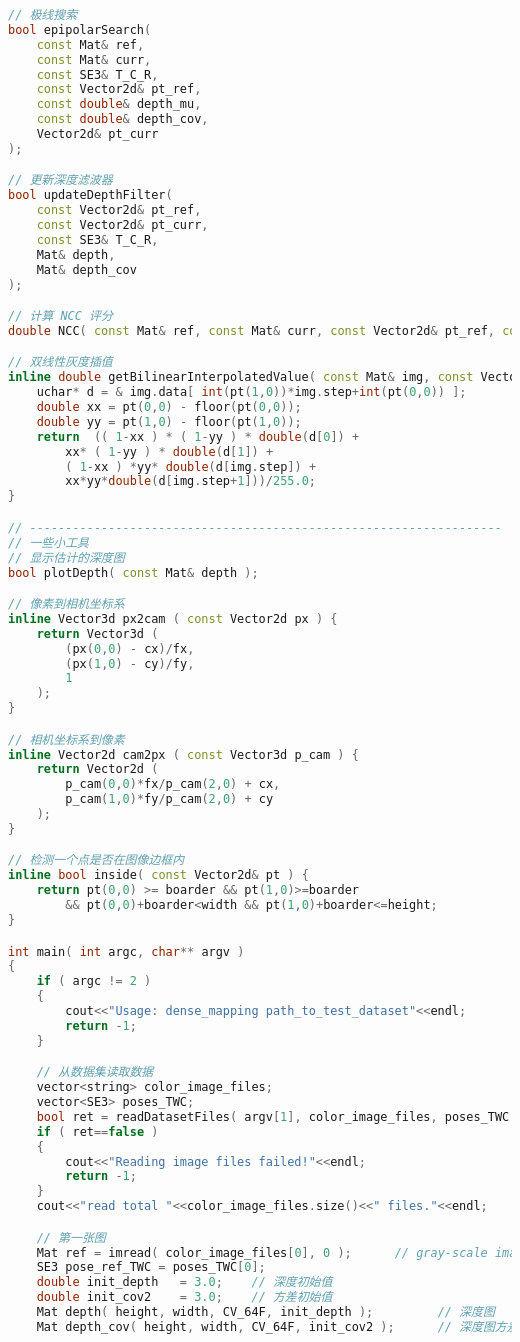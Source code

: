 \begin{lstlisting}[language=c++,caption=slambook/ch13/dense\_monocular/dense\_mapping.cpp（片段）]
// 极线搜索 
bool epipolarSearch( 
	const Mat& ref, 
	const Mat& curr, 
	const SE3& T_C_R, 
	const Vector2d& pt_ref, 
	const double& depth_mu, 
	const double& depth_cov,
	Vector2d& pt_curr
);

// 更新深度滤波器 
bool updateDepthFilter( 
	const Vector2d& pt_ref, 
	const Vector2d& pt_curr, 
	const SE3& T_C_R, 
	Mat& depth, 
	Mat& depth_cov
);

// 计算 NCC 评分 
double NCC( const Mat& ref, const Mat& curr, const Vector2d& pt_ref, const Vector2d& pt_curr );

// 双线性灰度插值 
inline double getBilinearInterpolatedValue( const Mat& img, const Vector2d& pt ) {
	uchar* d = & img.data[ int(pt(1,0))*img.step+int(pt(0,0)) ];
	double xx = pt(0,0) - floor(pt(0,0)); 
	double yy = pt(1,0) - floor(pt(1,0));
	return  (( 1-xx ) * ( 1-yy ) * double(d[0]) +
		xx* ( 1-yy ) * double(d[1]) +
		( 1-xx ) *yy* double(d[img.step]) +
		xx*yy*double(d[img.step+1]))/255.0;
}

// ------------------------------------------------------------------
// 一些小工具 
// 显示估计的深度图 
bool plotDepth( const Mat& depth );

// 像素到相机坐标系 
inline Vector3d px2cam ( const Vector2d px ) {
	return Vector3d ( 
		(px(0,0) - cx)/fx,
		(px(1,0) - cy)/fy, 
		1
	);
}

// 相机坐标系到像素 
inline Vector2d cam2px ( const Vector3d p_cam ) {
	return Vector2d (
		p_cam(0,0)*fx/p_cam(2,0) + cx, 
		p_cam(1,0)*fy/p_cam(2,0) + cy 
	);
}

// 检测一个点是否在图像边框内
inline bool inside( const Vector2d& pt ) {
	return pt(0,0) >= boarder && pt(1,0)>=boarder 
		&& pt(0,0)+boarder<width && pt(1,0)+boarder<=height;
}

int main( int argc, char** argv )
{
	if ( argc != 2 )
	{
		cout<<"Usage: dense_mapping path_to_test_dataset"<<endl;
		return -1;
	}

	// 从数据集读取数据
	vector<string> color_image_files; 
	vector<SE3> poses_TWC;
	bool ret = readDatasetFiles( argv[1], color_image_files, poses_TWC );
	if ( ret==false )
	{
		cout<<"Reading image files failed!"<<endl;
		return -1; 
	}
	cout<<"read total "<<color_image_files.size()<<" files."<<endl;

	// 第一张图
	Mat ref = imread( color_image_files[0], 0 );      // gray-scale image 
	SE3 pose_ref_TWC = poses_TWC[0];
	double init_depth   = 3.0;    // 深度初始值
	double init_cov2    = 3.0;    // 方差初始值 
	Mat depth( height, width, CV_64F, init_depth );         // 深度图
	Mat depth_cov( height, width, CV_64F, init_cov2 );      // 深度图方差 
	

\end{lstlisting}
